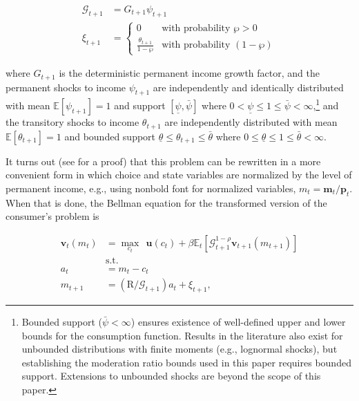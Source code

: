 \documentclass[preprint,authoryear]{elsarticle}
\newcommand{\Ex}{\mathbf{\mathbb{E}}}
\newcommand{\DiscFac}{\beta}
\newcommand{\uFunc}{\mathbf{u}}
\newcommand{\CRRA}{\rho}
\newcommand{\cNrm}{c}
\newcommand{\Rfree}{\text{R}}
\newcommand{\PermGroShk}{\mathcal{G}}
\newcommand{\tranShk}{\xi}
\newcommand{\mLvl}{\mathbf{m}}
\newcommand{\pLvl}{\mathbf{p}}
\newcommand{\PermGroFac}{G}
\newcommand{\permShk}{\psi}
\newcommand{\tranShkEmp}{\theta}
\newcommand{\WorstProb}{\wp}
\newcommand{\permShkMin}{\underline{\permShk}}
\newcommand{\permShkMax}{\bar{\permShk}}
\newcommand{\tranShkEmpMin}{\underline{\tranShkEmp}}
\newcommand{\tranShkEmpMax}{\bar{\tranShkEmp}}
\newcommand{\mNrm}{m}
\newcommand{\aNrm}{a}
\newcommand{\vFunc}{\mathbf{v}}
\begin{document}
\begin{equation}
\label{eq:ExogVars}
\begin{aligned}
\PermGroShk_{t+1} &= \PermGroFac_{t+1} \permShk_{t+1}  \\
\tranShk_{t+1} &= \begin{cases}
0 & \text{with probability } \WorstProb > 0 \\
\frac{\tranShkEmp_{t+1}}{1-\WorstProb} & \text{with probability } (1-\WorstProb)
\end{cases}
\end{aligned}
\end{equation}

where $\PermGroFac_{t+1}$ is the deterministic permanent income growth factor, and the permanent shocks to income $\permShk_{t+1}$ are independently and identically distributed with mean $\Ex[\permShk_{t+1}] = 1$ and support $[\permShkMin, \permShkMax]$ where $0 < \permShkMin \leq 1 \leq \permShkMax < \infty$,\footnote{Bounded support ($\permShkMax < \infty$) ensures existence of well-defined upper and lower bounds for the consumption function. Results in the literature also exist for unbounded distributions with finite moments (e.g., lognormal shocks), but establishing the moderation ratio bounds used in this paper requires bounded support. Extensions to unbounded shocks are beyond the scope of this paper.} and the transitory shocks to income $\tranShkEmp_{t+1}$ are independently distributed with mean $\Ex[\tranShkEmp_{t+1}] = 1$ and bounded support $\tranShkEmpMin \leq \tranShkEmp_{t+1} \leq \tranShkEmpMax$ where $0 \leq \tranShkEmpMin \leq 1 \leq \tranShkEmpMax < \infty$.

It turns out (see \citet{SolvingMicroDSOPs} for a proof) that this problem can
be rewritten in a more convenient form in which choice and state variables are
normalized by the level of permanent income, e.g., using nonbold font for normalized variables, $\mNrm_{t}=\mLvl_{t}/\pLvl_{t}$. When that is done, the
Bellman equation for the transformed version of the consumer's problem is

\begin{equation}
\label{eq:vNormed}
\begin{aligned}
\vFunc_{t}(\mNrm_{t}) &= \max_{\cNrm_{t}} ~~ \uFunc(\cNrm_{t})+\DiscFac \Ex_{t}[ \PermGroShk_{t+1}^{1-\CRRA}\vFunc_{t+1}(\mNrm_{t+1})] \\
&\text{s.t.} \\
\aNrm_{t} &= \mNrm_{t}-\cNrm_{t} \\
\mNrm_{t+1} &= \left(\Rfree/\PermGroShk_{t+1}\right)\aNrm_{t}+\tranShk_{t+1},
\end{aligned}
\end{equation}
\end{document}
